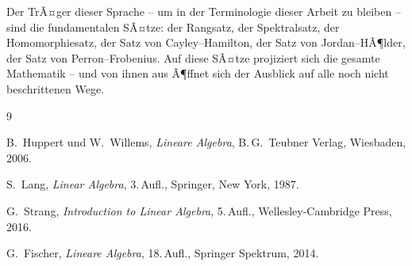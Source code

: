 ﻿\documentclass[a4paper,12pt]{report}
\theoremstyle{definition}
\begin{document}
Der TrÃ¤ger dieser Sprache -- um in der Terminologie dieser Arbeit
zu bleiben -- sind die fundamentalen SÃ¤tze: der Rangsatz,
der Spektralsatz, der Homomorphiesatz, der Satz von Cayley--Hamilton,
der Satz von Jordan--HÃ¶lder, der Satz von Perron--Frobenius.
Auf diese SÃ¤tze projiziert sich die gesamte Mathematik --
und von ihnen aus Ã¶ffnet sich der Ausblick auf alle noch
nicht beschrittenen Wege.

\begin{thebibliography}{9}

B.~Huppert und W.~Willems,
\textit{Lineare Algebra},
B.\,G.~Teubner Verlag, Wiesbaden, 2006.

S.~Lang,
\textit{Linear Algebra},
3.\,Aufl., Springer, New York, 1987.

G.~Strang,
\textit{Introduction to Linear Algebra},
5.\,Aufl., Wellesley-Cambridge Press, 2016.

G.~Fischer,
\textit{Lineare Algebra},
18.\,Aufl., Springer Spektrum, 2014.

\end{thebibliography}
\end{document}
